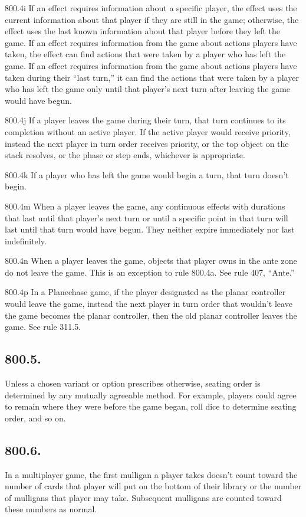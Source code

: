 800.4i If an effect requires information about a specific player, the effect uses the current information about that player if they are still in the game; otherwise, the effect uses the last known information about that player before they left the game. If an effect requires information from the game about actions players have taken, the effect can find actions that were taken by a player who has left the game. If an effect requires information from the game about actions players have taken during their “last turn,” it can find the actions that were taken by a player who has left the game only until that player’s next turn after leaving the game would have begun.

800.4j If a player leaves the game during their turn, that turn continues to its completion without an active player. If the active player would receive priority, instead the next player in turn order receives priority, or the top object on the stack resolves, or the phase or step ends, whichever is appropriate.

800.4k If a player who has left the game would begin a turn, that turn doesn’t begin.

800.4m When a player leaves the game, any continuous effects with durations that last until that player’s next turn or until a specific point in that turn will last until that turn would have begun. They neither expire immediately nor last indefinitely.

800.4n When a player leaves the game, objects that player owns in the ante zone do not leave the game. This is an exception to rule 800.4a. See rule 407, “Ante.”

800.4p In a Planechase game, if the player designated as the planar controller would leave the game, instead the next player in turn order that wouldn’t leave the game becomes the planar controller, then the old planar controller leaves the game. See rule 311.5.

\subsection*{800.5.}
Unless a chosen variant or option prescribes otherwise, seating order is determined by any mutually agreeable method. For example, players could agree to remain where they were before the game began, roll dice to determine seating order, and so on.

\subsection*{800.6.}
In a multiplayer game, the first mulligan a player takes doesn’t count toward the number of cards that player will put on the bottom of their library or the number of mulligans that player may take. Subsequent mulligans are counted toward these numbers as normal.

